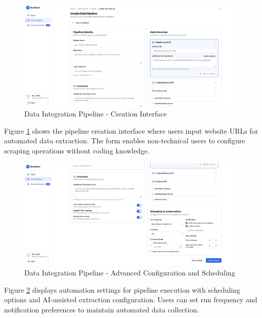 \begin{figure}[h]
\centering
\includegraphics[width=1\textwidth]{assets/ui/data-pipelines-create.png}
\caption{Data Integration Pipeline - Creation Interface}
\label{fig:data-pipelines-create-1}
\end{figure}

Figure \ref{fig:data-pipelines-create-1} shows the pipeline creation interface where users input website URLs for automated data extraction. The form enables non-technical users to configure scraping operations without coding knowledge.

\begin{figure}[h]
\centering
\includegraphics[width=1\textwidth]{assets/ui/data-pipelines-create-2.png}
\caption{Data Integration Pipeline - Advanced Configuration and Scheduling}
\label{fig:data-pipelines-create-2}
\end{figure}

Figure \ref{fig:data-pipelines-create-2} displays automation settings for pipeline execution with scheduling options and AI-assisted extraction configuration. Users can set run frequency and notification preferences to maintain automated data collection.

